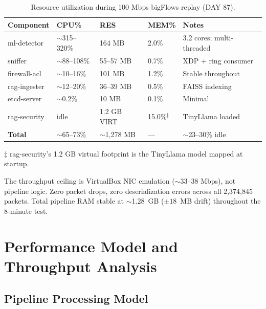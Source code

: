 \documentclass[11pt,a4paper]{article}
\begin{document}
    \begin{table}[h]
        \centering
        \caption{Resource utilization during 100 Mbps bigFlows replay (DAY 87).}
        \label{tab:resources}
        \begin{tabular}{lllll}
            \toprule
            \textbf{Component} & \textbf{CPU\%} & \textbf{RES} & \textbf{MEM\%} & \textbf{Notes} \\
            \midrule
            ml-detector       & ${\sim}$315--320\% & 164 MB    & 2.0\%  & 3.2 cores; multi-threaded \\
            sniffer           & ${\sim}$88--108\%  & 55--57 MB & 0.7\%  & XDP + ring consumer \\
            firewall-acl      & ${\sim}$10--16\%   & 101 MB    & 1.2\%  & Stable throughout \\
            rag-ingester      & ${\sim}$12--20\%   & 36--39 MB & 0.5\%  & FAISS indexing \\
            etcd-server       & ${\sim}$0.2\%      & 10 MB     & 0.1\%  & Minimal \\
            rag-security      & idle               & 1.2 GB VIRT & 15.0\%$^{\ddagger}$ & TinyLlama loaded \\
            \midrule
            \textbf{Total}    & ${\sim}$65--73\%   & ${\sim}$1,278 MB & --- & ${\sim}$23--30\% idle \\
            \bottomrule
        \end{tabular}
        \medskip
        \footnotesize{$\ddagger$ rag-security's 1.2 GB virtual footprint is the TinyLlama model
        mapped at startup.}
    \end{table}

    The throughput ceiling is VirtualBox NIC emulation (${\sim}$33--38 Mbps), not pipeline
    logic. Zero packet drops, zero deserialization errors across all 2,374,845 packets. Total
    pipeline RAM stable at ${\sim}$1.28~GB (${\pm}18$~MB drift) throughout the 8-minute test.

    \section{Performance Model and Throughput Analysis}

    \subsection{Pipeline Processing Model}
\end{document}
